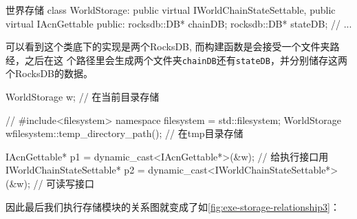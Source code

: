 \begin{numberedc}{世界存储}{\label{code:WorldStorage}}
class WorldStorage: public virtual IWorldChainStateSettable,
                      public virtual IAcnGettable
  {
  public:
    rocksdb::DB* chainDB;
    rocksdb::DB* stateDB;
  // ...
}
\end{numberedc}

可以看到这个类底下的实现是两个RocksDB, 而构建函数是会接受一个文件夹路经，之后在这
个路径里会生成两个文件夹\texttt{chainDB}还有\texttt{stateDB}，并分别储存这两
个RocksDB的数据。
\begin{simplec}
  WorldStorage w{};               // 在当前目录存储

  // #include<filesystem>
  namespace filesystem =  std::filesystem;
  WorldStorage w{filesystem::temp_directory_path()}; // 在tmp目录存储

  IAcnGettable* p1 = dynamic_cast<IAcnGettable*>(&w); // 给执行接口用
  IWorldChainStateSettable* p2 = dynamic_cast<IWorldChainStateSettable*>(&w); // 可读写接口
\end{simplec}
因此最后我们执行存储模块的关系图就变成了如\cref{fig:exe-storage-relationship3}：

